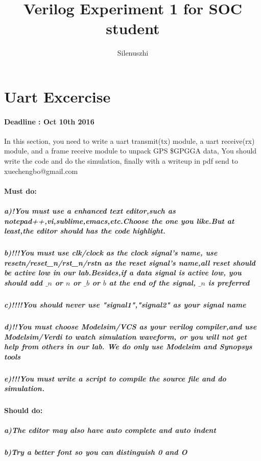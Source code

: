 \documentclass{article}
\author{Silenuszhi}
\title{Verilog Experiment 1 for SOC student}
\begin{document}
\maketitle
\newpage{}
\section{Uart Excercise}
\paragraph{Deadline : Oct 10th 2016\\}
In this section, you need to write a uart transmit(tx) module, a uart receive(rx) module, and a frame receive module to unpack GPS \$GPGGA data, You should write the code and do the simulation, finally with a writeup in pdf send to xuechengbo@gmail.com
\paragraph{Must do:}
\subparagraph {a)!You must use a enhanced text editor,such as notepad++,vi,sublime,emacs,etc.Choose the one you like.But at least,the editor should has the code highlight.}
\subparagraph {b)!!!You must use clk/clock as the clock signal's name, use resetn/reset\_n/rst\_n/rstn as the reset signal's name,all reset should be active low in our lab.Besides,if a data signal is active low, you should add $\_n$ or $n$ or $\_b$ or $b$ at the end of the signal, $\_n$ is preferred}
\subparagraph {c)!!!!You should never use "signal1","signal2" as your signal name}
\subparagraph {d)!!You must choose Modelsim/VCS as your verilog compiler,and use Modelsim/Verdi to watch simulation waveform, or you will not get help from others in our lab. We do only use Modelsim and Synopsys tools}
\subparagraph {e)!!!You must write a script to compile the source file and do simulation.}
\paragraph{Should do:}
\subparagraph {a)The editor may also have auto complete and auto indent}
\subparagraph {b)Try a better font so you can distinguish 0 and O}
\end{document}
